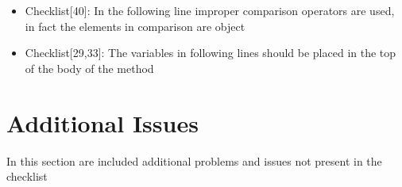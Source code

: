 \documentclass[11pt,titlepage]{article} %
\begin{document}
\begin{itemize}
\begin{itemize}
    \item Checklist[40]: In the following line improper comparison operators are used, in fact the elements in comparison are object
      
    \item Checklist[29,33]: The variables in following lines should be placed in the top of the body of the method
      

    \end{itemize}
  \end{itemize}
\newpage
\section{Additional Issues}
  In this section are included additional problems and issues not present in the checklist
\end{document}
